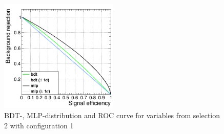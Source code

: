 \documentclass[11pt]{scrartcl}
\begin{document}
\begin{figure}[H]
\begin{minipage}{.5\textwidth}
	  \label{fig:distr_s2_config1_mlp}
	\end{minipage}
	\centering
	\includegraphics[width=0.5\textwidth]{figures/MVA/select2/config1/FOM_selection2_nL5_nT400_mD1_nC10.png}
	\caption{BDT-, MLP-distribution and ROC curve for variables from selection 2 with configuration 1}
	 \label{fig:ROC_s2_config1}
	\end{figure}
	
\end{document}
